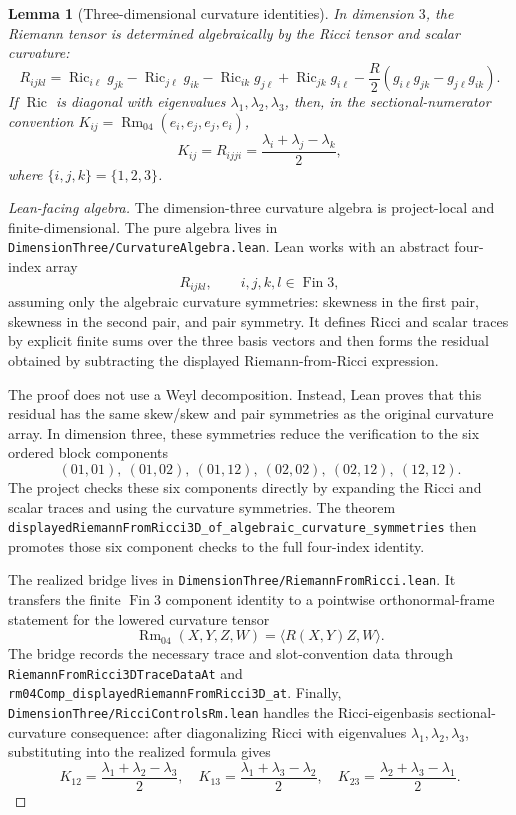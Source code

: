 \documentclass[11pt]{article}
\theoremstyle{plain}
\newtheorem{lemma}[theorem]{Lemma}
\theoremstyle{definition}
\theoremstyle{remark}
\newcommand{\Ric}{\operatorname{Ric}}
\newcommand{\Rm}{\operatorname{Rm}}
\newcommand{\leanref}[1]{\nolinkurl{#1}}
\newcommand{\leanfile}[1]{\nolinkurl{#1}}
\newcommand{\rffile}[1]{\leanfile{#1}}
\begin{document}
\begin{lemma}[Three-dimensional curvature identities]
\label{lem:3d-curvature-identities}
In dimension $3$, the Riemann tensor is determined algebraically by the Ricci
tensor and scalar curvature:
\[
R_{ijkl}
=
\Ric_{i\ell}g_{jk}-\Ric_{j\ell}g_{ik}
-\Ric_{ik}g_{j\ell}+\Ric_{jk}g_{i\ell}
-\frac R2\left(g_{i\ell}g_{jk}-g_{j\ell}g_{ik}\right).
\]
If $\Ric$ is diagonal with eigenvalues $\lambda_1,\lambda_2,\lambda_3$, then, in
the sectional-numerator convention $K_{ij}=\Rm_{04}(e_i,e_j,e_j,e_i)$,
\[
K_{ij}=R_{ijji}=\frac{\lambda_i+\lambda_j-\lambda_k}{2},
\]
where $\{i,j,k\}=\{1,2,3\}$.
\end{lemma}

\begin{proof}[Lean-facing algebra]
The dimension-three curvature algebra is project-local and finite-dimensional.
The
pure algebra lives in \rffile{DimensionThree/CurvatureAlgebra.lean}.  Lean
works with an abstract four-index array
\[
  R_{ijkl},\qquad i,j,k,l\in \operatorname{Fin} 3,
\]
assuming only the algebraic curvature symmetries: skewness in the first pair,
skewness in the second pair, and pair symmetry.  It defines Ricci and scalar
traces by explicit finite sums over the three basis vectors and then forms the
residual obtained by subtracting the displayed Riemann-from-Ricci expression.

The proof does not use a Weyl decomposition.  Instead, Lean proves that this
residual has the same skew/skew and pair symmetries as the original curvature
array.  In dimension three, these symmetries reduce the verification to the six
ordered block components
\[
  (01,01),\ (01,02),\ (01,12),\ (02,02),\ (02,12),\ (12,12).
\]
The project checks these six components directly by expanding the Ricci and
scalar traces and using the curvature symmetries.  The theorem
\leanref{displayedRiemannFromRicci3D_of_algebraic_curvature_symmetries}
then promotes those six component checks to the full four-index identity.

The realized bridge lives in \rffile{DimensionThree/RiemannFromRicci.lean}.  It
transfers the finite \(\operatorname{Fin} 3\) component identity to a pointwise
orthonormal-frame statement for the lowered curvature tensor
\[
  \Rm_{04}(X,Y,Z,W)=\langle R(X,Y)Z,W\rangle .
\]
The bridge records the necessary trace and slot-convention data through
\leanref{RiemannFromRicci3DTraceDataAt} and
\leanref{rm04Comp_displayedRiemannFromRicci3D_at}.  Finally,
\rffile{DimensionThree/RicciControlsRm.lean} handles the Ricci-eigenbasis
sectional-curvature consequence: after diagonalizing Ricci with eigenvalues
\(\lambda_1,\lambda_2,\lambda_3\), substituting into the realized formula gives
\[
  K_{12}=\frac{\lambda_1+\lambda_2-\lambda_3}{2},
  \quad
  K_{13}=\frac{\lambda_1+\lambda_3-\lambda_2}{2},
  \quad
  K_{23}=\frac{\lambda_2+\lambda_3-\lambda_1}{2}.
\]
\end{proof}
\end{document}
